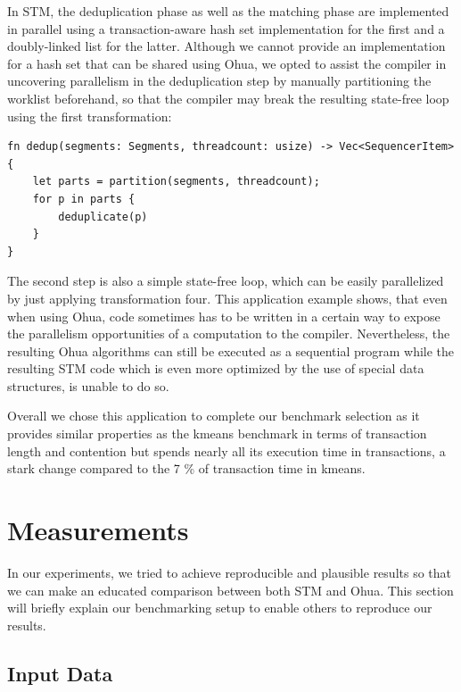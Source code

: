 In STM, the deduplication phase as well as the matching phase are implemented in parallel using a transaction-aware hash set implementation for the first and a doubly-linked list for the latter.
Although we cannot provide an implementation for a hash set that can be shared using Ohua, we opted to assist the compiler in uncovering parallelism in the deduplication step by manually partitioning the worklist beforehand, so that the compiler may break the resulting state-free loop using the first transformation:
\begin{verbatim}
fn dedup(segments: Segments, threadcount: usize) -> Vec<SequencerItem> {
    let parts = partition(segments, threadcount);
    for p in parts {
        deduplicate(p)
    }
}
\end{verbatim}
The second step is also a simple state-free loop, which can be easily parallelized by just applying transformation four.
This application example shows, that even when using Ohua, code sometimes has to be written in a certain way to expose the parallelism opportunities of a computation to the compiler.
Nevertheless, the resulting Ohua algorithms can still be executed as a sequential program while the resulting STM code which is even more optimized by the use of special data structures, is unable to do so.

Overall we chose this application to complete our benchmark selection as it provides similar properties as the kmeans benchmark in terms of transaction length and contention but spends nearly all its execution time in transactions, a stark change compared to the 7 \% of transaction time in kmeans.




\section{Measurements}
\label{sec:experiments:measurements}

In our experiments, we tried to achieve reproducible and plausible results so that we can make an educated comparison between both STM and Ohua.
This section will briefly explain our benchmarking setup to enable others to reproduce our results.

\subsection{Input Data}
\label{sec:experiments:measurements:inputs}

